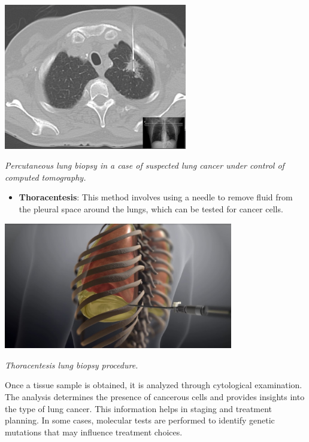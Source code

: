 \vspace{1em}
\begin{center}
    \includegraphics[width=0.60\textwidth]{../assets/04-diagnosis/lc-needle-biopsy.png}

    \small\textit{Percutaneous lung biopsy in a case of suspected lung cancer under control of 
    computed tomography. \cite{enwiki:1188144138}}
\end{center}
\vspace{1em}

\begin{itemize}
    \item \textbf{Thoracentesis}: This method involves using a needle to remove fluid from the 
    pleural space around the lungs, which can be tested for cancer cells.
\end{itemize}

\vspace{1em}
\begin{center}
    \includegraphics[width=0.75\textwidth]{../assets/04-diagnosis/lc-thoracentesis.jpg}

    \small\textit{Thoracentesis lung biopsy procedure. \cite{youtube_QubaJaH_THc}}
\end{center}
\vspace{1em}

Once a tissue sample is obtained, it is analyzed through cytological examination. The analysis 
determines the presence of cancerous cells and provides insights into the type of lung cancer. This 
information helps in staging and treatment planning. In some cases, molecular tests are performed to 
identify genetic mutations that may influence treatment choices.

